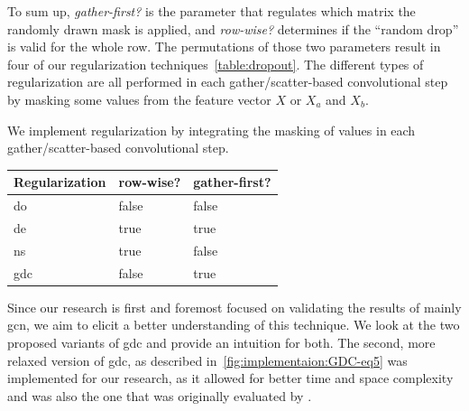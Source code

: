 To sum up, \textit{gather-first?} is the parameter that regulates which matrix the randomly drawn mask is applied, and \textit{row-wise?} determines if the ``random drop'' is valid for the whole row.
The permutations of those two parameters result in four of our regularization techniques~\cref{table:dropout}.
The different types of regularization are all performed in each gather/scatter-based convolutional step by masking some values from the feature vector $X$ or $X_a$ and $X_b$.

We implement regularization by integrating the masking of values in each gather/scatter-based convolutional step.
\begin{center}
    \begin{tabular}{lll}
        \toprule
        \textbf{Regularization} & \textbf{row-wise?} & \textbf{gather-first?} \\
        \midrule
        \acf{do}                & false              & false                  \\
        \acf{de}                & true               & true                   \\
        \acf{ns}                & true               & false                  \\
        \acf{gdc}               & false              & true                   \\

        \bottomrule
    \end{tabular}
    \label{table:dropout}
\end{center}

Since our research is first and foremost focused on validating the results of mainly \ac{gcn}, we aim to elicit a better understanding of this technique.
We look at the two proposed variants of \ac{gdc} and provide an intuition for both.
The second, more relaxed version of \ac{gdc}, as described in~\cref{fig:implementaion:GDC-eq5} was implemented for our research, as it allowed for better time and space complexity and was also the one that was originally evaluated by \citep{Hasanzadeh2020}.

